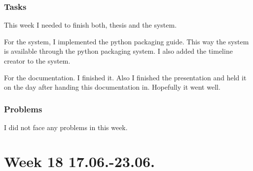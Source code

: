\subsubsection{Tasks}

This week I needed to finish both, thesis and the system.

For the system, I implemented the python packaging guide. This way the system is available through the python packaging system. I also added the timeline creator to the system.

For the documentation. I finished it. Also I finished the presentation and held it on the day after handing this documentation in. Hopefully it went well.

\subsubsection{Problems}

I did not face any problems in this week.

\section{Week 18 17.06.-23.06.}
\label{sec:journal:week18}

